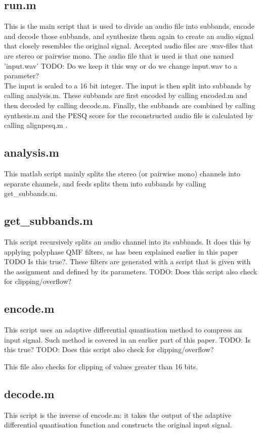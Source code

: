 \documentclass[a4paper]{article}
\begin{document}
\subsection{run.m}
This is the main script that is used to divide an audio file into subbands, encode and decode those subbands, and synthesize them again to create an audio signal that closely resembles the original signal. Accepted audio files are .wav-files that are stereo or pairwise mono. The audio file that is used is that one named 'input.wav' TODO: Do we keep it this way or do we change input.wav to a parameter? 
\\
The input is scaled to a 16 bit integer. The input is then split into subbands by calling analysis.m. These subbands are first encoded by calling encoded.m and then decoded by calling decode.m. Finally, the subbands are combined by calling synthesis.m and the PESQ score for the reconstructed audio file is calculated by calling alignpesq.m	.

\subsection{analysis.m}
This matlab script mainly splits the stereo (or pairwise mono) channels into separate channels, and feeds splits them into subbands by calling get\_subbands.m.

\subsection{get\_subbands.m}
This script recursively splits an audio channel into its subbands. It does this by applying polyphase QMF filters, as has been explained earlier in this paper TODO Is this true?. These filters are generated with a script that is given with the assignment and defined by its parameters.
TODO: Does this script also check for clipping/overflow?
\subsection{encode.m}
This script uses an adaptive differential quantisation method to compress an input signal. Such method is covered in an earlier part of this paper. TODO: Is this true?
TODO: Does this script also check for clipping/overflow?

This file also checks for clipping of values greater than 16 bits.

\subsection{decode.m}
This script is the inverse of encode.m: it takes the output of the adaptive differential quantisation function and constructs the original input signal.
\end{document}
